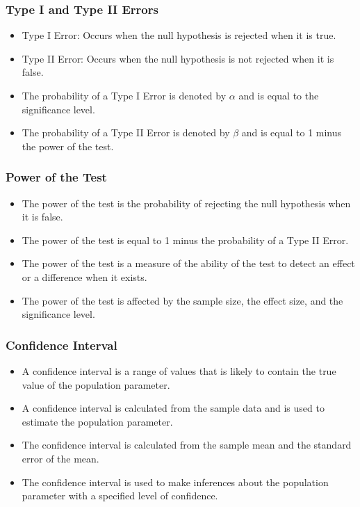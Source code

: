 \documentclass[serif, 9pt, aspectratio=32]{beamer}
\begin{document}
\begin{frame}
    \frametitle{Type I and Type II Errors}
    \begin{itemize}
        \setlength{\itemsep}{2em}
        \item Type I Error: Occurs when the null hypothesis is rejected when it is true.
        \item Type II Error: Occurs when the null hypothesis is not rejected when it is false.
        \item The probability of a Type I Error is denoted by $\alpha$ and is equal to the significance level.
        \item The probability of a Type II Error is denoted by $\beta$ and is equal to 1 minus the power of the test.
    \end{itemize}
\end{frame}

\begin{frame}
    \frametitle{Power of the Test}
    \begin{itemize}
        \setlength{\itemsep}{2em}
        \item The power of the test is the probability of rejecting the null hypothesis when it is false.
        \item The power of the test is equal to 1 minus the probability of a Type II Error.
        \item The power of the test is a measure of the ability of the test to detect an effect or a difference when it exists.
        \item The power of the test is affected by the sample size, the effect size, and the significance level.
    \end{itemize}
\end{frame}

\begin{frame}
    \frametitle{Confidence Interval}
    \begin{itemize}
        \setlength{\itemsep}{2em}
        \item A confidence interval is a range of values that is likely to contain the true value of the population parameter.
        \item A confidence interval is calculated from the sample data and is used to estimate the population parameter.
        \item The confidence interval is calculated from the sample mean and the standard error of the mean.
        \item The confidence interval is used to make inferences about the population parameter with a specified level of confidence.
    \end{itemize}
\end{frame}
\end{document}
